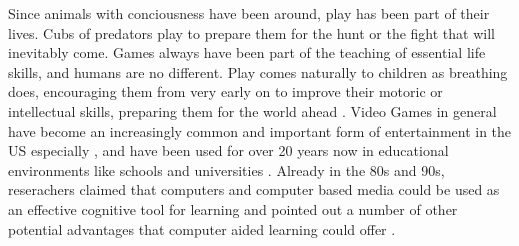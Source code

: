 Since animals with conciousness have been around, play has been part of their lives. Cubs of predators play to prepare them for the hunt or the fight that will inevitably come. Games always have been part of the teaching of essential life skills, and humans are no different. Play comes naturally to children as breathing does, encouraging them from very early on to improve their motoric or intellectual skills, preparing them for the world ahead \cite{traditional} \cite{lifelong}.
Video Games in general have become an increasingly common and important form of entertainment in the US especially \cite{engage}, and have been used for over 20 years now in educational environments like schools and universities \cite{compare}.
Already in the 80s and 90s, reserachers claimed that computers and computer based media could be used as an effective cognitive tool for learning and pointed out a number of other potential advantages that computer aided learning could offer \cite{aspects}.